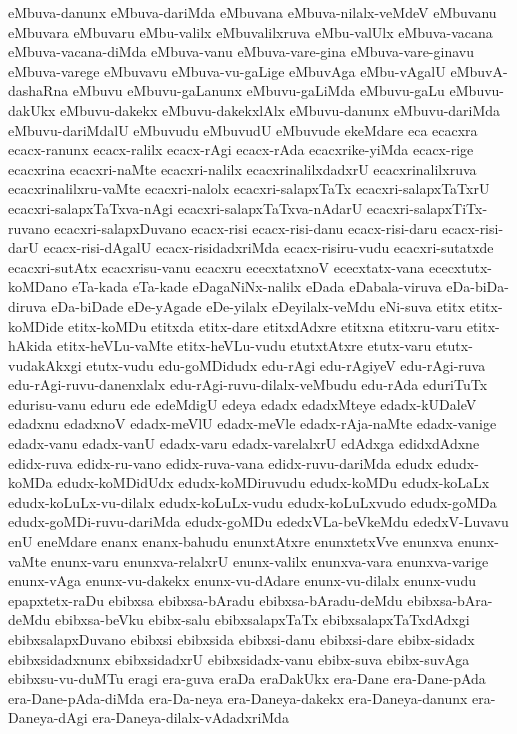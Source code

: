 {eMbuva-danunx
eMbuva-dariMda
eMbuvana
eMbuva-nilalx-veMdeV
eMbuvanu
eMbuvara
eMbuvaru
eMbu-valilx
eMbuvalilxruva
eMbu-valUlx
eMbuva-vacana
eMbuva-vacana-diMda
eMbuva-vanu
eMbuva-vare-gina
eMbuva-vare-ginavu
eMbuva-varege
eMbuvavu
eMbuva-vu-gaLige
eMbuvAga
eMbu-vAgalU
eMbuvA-dashaRna
eMbuvu
eMbuvu-gaLanunx
eMbuvu-gaLiMda
eMbuvu-gaLu
eMbuvu-dakUkx
eMbuvu-dakekx
eMbuvu-dakekxlAlx
eMbuvu-danunx
eMbuvu-dariMda
eMbuvu-dariMdalU
eMbuvudu
eMbuvudU
eMbuvude
ekeMdare
eca
ecacxra
ecacx-ranunx
ecacx-ralilx
ecacx-rAgi
ecacx-rAda
ecacxrike-yiMda
ecacx-rige
ecacxrina
ecacxri-naMte
ecacxri-nalilx
ecacxrinalilxdadxrU
ecacxrinalilxruva
ecacxrinalilxru-vaMte
ecacxri-nalolx
ecacxri-salapxTaTx
ecacxri-salapxTaTxrU
ecacxri-salapxTaTxva-nAgi
ecacxri-salapxTaTxva-nAdarU
ecacxri-salapxTiTx-ruvano
ecacxri-salapxDuvano
ecacx-risi
ecacx-risi-danu
ecacx-risi-daru
ecacx-risi-darU
ecacx-risi-dAgalU
ecacx-risidadxriMda
ecacx-risiru-vudu
ecacxri-sutatxde
ecacxri-sutAtx
ecacxrisu-vanu
ecacxru
ececxtatxnoV
ececxtatx-vana
ececxtutx-koMDano
eTa-kada
eTa-kade
eDagaNiNx-nalilx
eDada
eDabala-viruva
eDa-biDa-diruva
eDa-biDade
eDe-yAgade
eDe-yilalx
eDeyilalx-veMdu
eNi-suva
etitx
etitx-koMDide
etitx-koMDu
etitxda
etitx-dare
etitxdAdxre
etitxna
etitxru-varu
etitx-hAkida
etitx-heVLu-vaMte
etitx-heVLu-vudu
etutxtAtxre
etutx-varu
etutx-vudakAkxgi
etutx-vudu
edu-goMDidudx
edu-rAgi
edu-rAgiyeV
edu-rAgi-ruva
edu-rAgi-ruvu-danenxlalx
edu-rAgi-ruvu-dilalx-veMbudu
edu-rAda
eduriTuTx
edurisu-vanu
eduru
ede
edeMdigU
edeya
edadx
edadxMteye
edadx-kUDaleV
edadxnu
edadxnoV
edadx-meVlU
edadx-meVle
edadx-rAja-naMte
edadx-vanige
edadx-vanu
edadx-vanU
edadx-varu
edadx-varelalxrU
edAdxga
edidxdAdxne
edidx-ruva
edidx-ru-vano
edidx-ruva-vana
edidx-ruvu-dariMda
edudx
edudx-koMDa
edudx-koMDidUdx
edudx-koMDiruvudu
edudx-koMDu
edudx-koLaLx
edudx-koLuLx-vu-dilalx
edudx-koLuLx-vudu
edudx-koLuLxvudo
edudx-goMDa
edudx-goMDi-ruvu-dariMda
edudx-goMDu
ededxVLa-beVkeMdu
ededxV-Luvavu
enU
eneMdare
enanx
enanx-bahudu
enunxtAtxre
enunxtetxVve
enunxva
enunx-vaMte
enunx-varu
enunxva-relalxrU
enunx-valilx
enunxva-vara
enunxva-varige
enunx-vAga
enunx-vu-dakekx
enunx-vu-dAdare
enunx-vu-dilalx
enunx-vudu
epapxtetx-raDu
ebibxsa
ebibxsa-bAradu
ebibxsa-bAradu-deMdu
ebibxsa-bAra-deMdu
ebibxsa-beVku
ebibx-salu
ebibxsalapxTaTx
ebibxsalapxTaTxdAdxgi
ebibxsalapxDuvano
ebibxsi
ebibxsida
ebibxsi-danu
ebibxsi-dare
ebibx-sidadx
ebibxsidadxnunx
ebibxsidadxrU
ebibxsidadx-vanu
ebibx-suva
ebibx-suvAga
ebibxsu-vu-duMTu
eragi
era-guva
eraDa
eraDakUkx
era-Dane
era-Dane-pAda
era-Dane-pAda-diMda
era-Da-neya
era-Daneya-dakekx
era-Daneya-danunx
era-Daneya-dAgi
era-Daneya-dilalx-vAdadxriMda
}
